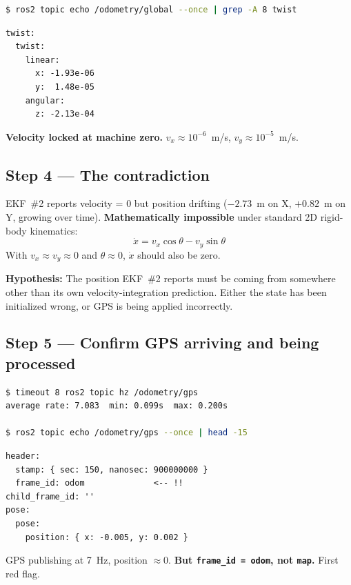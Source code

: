 \documentclass[11pt,a4paper]{article}
\begin{document}
\begin{lstlisting}[language=bash]
$ ros2 topic echo /odometry/global --once | grep -A 8 twist
\end{lstlisting}

\begin{lstlisting}
twist:
  twist:
    linear:
      x: -1.93e-06
      y:  1.48e-05
    angular:
      z: -2.13e-04
\end{lstlisting}

\noindent
\textbf{Velocity locked at machine zero.} $v_x \approx 10^{-6}$~m/s, $v_y \approx 10^{-5}$~m/s.

\subsection{Step 4 --- The contradiction}

EKF~\#2 reports velocity = 0 but position drifting ($-2.73$~m on X, $+0.82$~m on Y, growing
over time). \textbf{Mathematically impossible} under standard 2D rigid-body kinematics:
\[
\dot{x} = v_x \cos\theta - v_y \sin\theta
\]
With $v_x \approx v_y \approx 0$ and $\theta \approx 0$, $\dot{x}$ should also be zero.

\noindent
\textbf{Hypothesis:} The position EKF~\#2 reports must be coming from somewhere other than
its own velocity-integration prediction. Either the state has been initialized wrong, or
GPS is being applied incorrectly.

\subsection{Step 5 --- Confirm GPS arriving and being processed}

\begin{lstlisting}[language=bash]
$ timeout 8 ros2 topic hz /odometry/gps
average rate: 7.083  min: 0.099s  max: 0.200s

$ ros2 topic echo /odometry/gps --once | head -15
\end{lstlisting}

\begin{lstlisting}
header:
  stamp: { sec: 150, nanosec: 900000000 }
  frame_id: odom              <-- !!
child_frame_id: ''
pose:
  pose:
    position: { x: -0.005, y: 0.002 }
\end{lstlisting}

\noindent
GPS publishing at 7~Hz, position $\approx 0$. \textbf{But \texttt{frame\_id = odom}, not
\texttt{map}.} First red flag.
\end{document}
